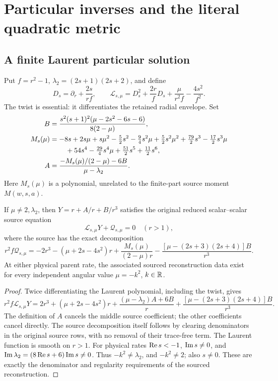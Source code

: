 \section{Particular inverses and the literal quadratic metric}

\subsection{A finite Laurent particular solution}

Put \(f=r^2-1\), \(\lambda_2=(2s+1)(2s+2)\), and define
\[
 D_s=\partial_r+\frac{2s}{rf},\qquad
 \mathcal L_{s,\mu}=D_s^2+\frac{2r}{f}D_s+
                      \frac{\mu}{r^2f}-\frac{4s^2}{f^2}.
\]
The twist is essential: it differentiates the retained radial envelope. Set
\begin{align*}
 B&=\frac{s^2(s+1)^2(\mu-2s^2-6s-6)}{8(2-\mu)},\\
 M_s(\mu)&=-8s+2s\mu+s\mu^2-\tfrac52s^2-\tfrac94s^2\mu
 +\tfrac52s^2\mu^2+\tfrac{79}2s^3-\tfrac{17}2s^3\mu\\
 &\hspace{8mm}+54s^4-\tfrac{29}4s^4\mu+\tfrac{51}2s^5+\tfrac{11}2s^6,\\
 A&=\frac{-M_s(\mu)/(2-\mu)-6B}{\mu-\lambda_2}.
\end{align*}
Here \(M_s(\mu)\) is a polynomial, unrelated to the finite-part source moment \(M(w,s,a)\).

\begin{theorem}\label{thm:laurent}
If \(\mu\ne2,\lambda_2\), then \(Y=r+A/r+B/r^3\) satisfies the original reduced scalar--scalar source equation
\[
 \mathcal L_{s,\mu}Y+\mathcal Q_{s,\mu}=0\quad(r>1),
\]
where the source has the exact decomposition
\[
 r^2f\mathcal Q_{s,\mu}=-2r^3-(\mu+2s-4s^2)r
 +\frac{M_s(\mu)}{(2-\mu)r}
 -\frac{[\mu-(2s+3)(2s+4)]B}{r^3}.
\]
At either physical parent rate, the associated sourced reconstruction data exist for every independent angular value \(\mu=-k^2\), \(k\in\mathbb R\).
\end{theorem}
\begin{proof}
Twice differentiating the Laurent polynomial, including the twist, gives
\[
 r^2f\mathcal L_{s,\mu}Y=2r^3+(\mu+2s-4s^2)r
 +\frac{(\mu-\lambda_2)A+6B}{r}
 +\frac{[\mu-(2s+3)(2s+4)]B}{r^3}.
\]
The definition of \(A\) cancels the middle source coefficient; the other coefficients cancel directly. The source decomposition itself follows by clearing denominators in the original source rows, with no removal of their trace-free term. The Laurent function is smooth on \(r>1\). For physical rates \(\operatorname{Re} s<-1\), \(\operatorname{Im} s\ne0\), and
\(\operatorname{Im}\lambda_2=(8\operatorname{Re} s+6)\operatorname{Im} s\ne0\). Thus \(-k^2\ne\lambda_2\), and \(-k^2\ne2\); also \(s\ne0\). These are exactly the denominator and regularity requirements of the sourced reconstruction.
\end{proof}

